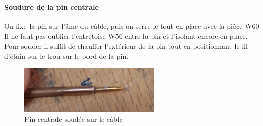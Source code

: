 \paragraph*{Soudure de la pin centrale} On fixe la pin sur l’âme du câble, puis on serre le tout en
place avec la pièce W60 Il ne faut pas oublier l’entretoise W56 entre la pin et l’isolant
encore en place.
Pour souder il suffit de chauffer l’extérieur de la pin tout en positionnant le fil d’étain sur
le trou sur le bord de la pin.
\begin{figure}[h]
    \begin{center}
        \includegraphics[width=0.60\textwidth]{Images/Coax/3}
        \caption{Pin centrale soudée sur le câble}
        \label{coax_soudure_centre}
    \end{center}
\end{figure}

